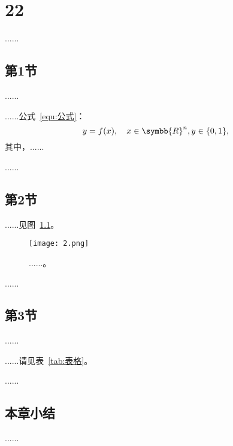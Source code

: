 
\chapter{22}\label{chapter:MLL}

......

\section{第1节}

......

......公式~\ref{equ:公式}：
\begin{equation}\label{equ:公式}
    y=f(x), \quad x \in \symbb{R}^{n}, y \in \{0,1\},
\end{equation}
其中，......

......

\section{第2节}

......见图~\ref{fig:图像}。

\begin{figure}[!htbp]
    \centering
    \texttt{[image: 2.png]}
    \caption{......。
    }\label{fig:图像}
\end{figure}

......

\section{第3节}

......

......请见表~\ref{tab:表格}。

\begin{table}[!htbp]
    \caption{......。}\label{tab:表格}
    \centering
    \footnotesize
\end{table}

......

\section{本章小结}

......
